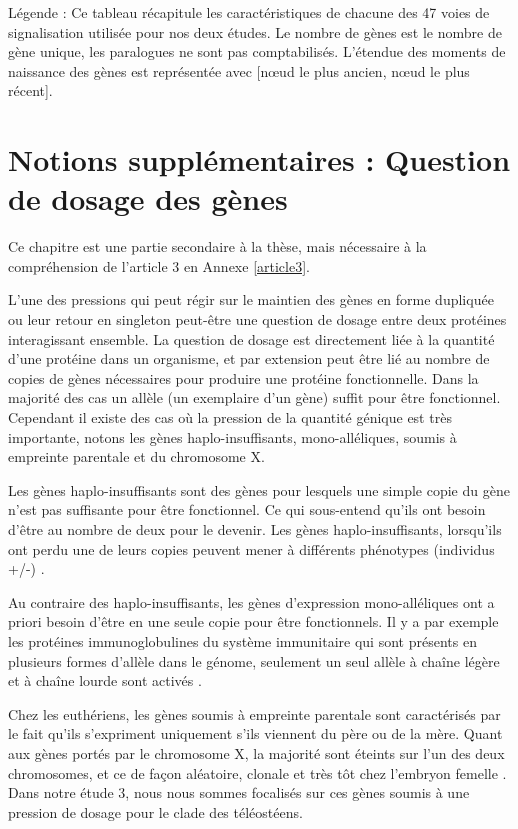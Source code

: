Légende : Ce tableau récapitule les caractéristiques de chacune des 47 voies de signalisation utilisée pour nos deux études. Le nombre de gènes est le nombre de gène unique, les paralogues ne sont pas comptabilisés. L’étendue des moments de naissance des gènes est représentée avec [nœud le plus ancien, nœud le plus récent].

\newpage
\section{Notions supplémentaires : Question de dosage des gènes}
\par Ce chapitre est une partie secondaire à la thèse, mais nécessaire à la compréhension de l’article 3 en Annexe \ref{article3}. 
\par L’une des pressions qui peut régir sur le maintien des gènes en forme dupliquée ou leur retour en singleton peut-être une question de dosage entre deux protéines interagissant ensemble. La question de dosage est directement liée à la quantité d’une protéine dans un organisme, et par extension peut être lié au nombre de copies de gènes nécessaires pour produire une protéine fonctionnelle. Dans la majorité des cas un allèle (un exemplaire d’un gène) suffit pour être fonctionnel. Cependant il existe des cas où la pression de la quantité génique est très importante, notons les gènes haplo-insuffisants, mono-alléliques, soumis à empreinte parentale et du chromosome X. 
\par Les gènes haplo-insuffisants sont des gènes pour lesquels une simple copie du gène n’est pas suffisante pour être fonctionnel. Ce qui sous-entend qu’ils ont besoin d’être au nombre de deux pour le devenir. Les gènes haplo-insuffisants, lorsqu’ils ont perdu une de leurs copies peuvent mener à différents phénotypes (individus +/-) \parencite{johnson_causes_2019}. 
\par Au contraire des haplo-insuffisants, les gènes d’expression mono-alléliques ont a priori besoin d’être en une seule copie pour être fonctionnels. Il y a par exemple les protéines immunoglobulines du système immunitaire qui sont présents en plusieurs formes d’allèle dans le génome, seulement un seul allèle à chaîne légère et à chaîne lourde sont activés \parencite{vettermann_allelic_2010}. 
\par Chez les euthériens, les gènes soumis à empreinte parentale sont caractérisés par le fait qu’ils s’expriment uniquement s’ils viennent du père ou de la mère. Quant aux gènes portés par le chromosome X, la majorité sont éteints sur l’un des deux chromosomes, et ce de façon aléatoire, clonale et très tôt chez l’embryon femelle \parencite{balaton_exceptional_2018}. 
Dans notre étude 3, nous nous sommes focalisés sur ces gènes soumis à une pression de dosage pour le clade des téléostéens. 


